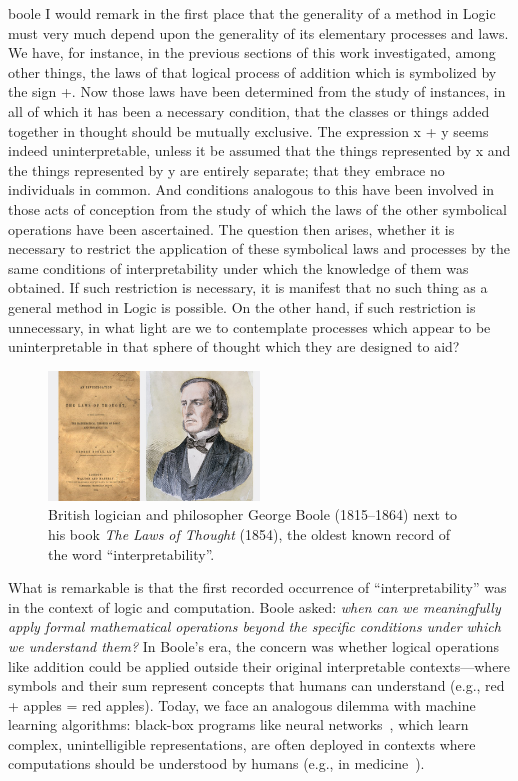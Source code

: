 \begin{displaycquote}[p.~48]{boole}
I would remark in the first place that the generality of a method in Logic
must very much depend upon the generality of its elementary processes and laws.
We have, for instance, in the previous sections of this work investigated, among
other things, the laws of that logical process of addition which is symbolized by
the sign +. Now those laws have been determined from the study of instances,
in all of which it has been a necessary condition, that the classes or things added
together in thought should be mutually exclusive. The expression x + y seems
indeed uninterpretable, unless it be assumed that the things represented by x
and the things represented by y are entirely separate; that they embrace no
individuals in common. And conditions analogous to this have been involved
in those acts of conception from the study of which the laws of the other
symbolical operations have been ascertained. The question then arises, whether
it is necessary to restrict the application of these symbolical laws and processes
by the same conditions of interpretability under which the knowledge of them
was obtained. If such restriction is necessary, it is manifest that no such thing
as a general method in Logic is possible. On the other hand, if such restriction
is unnecessary, in what light are we to contemplate processes which appear to
be uninterpretable in that sphere of thought which they are designed to aid?
\end{displaycquote}

\begin{figure}
    \centering
    \includegraphics[width=0.5\textwidth]{images/images_intro/gboole.jpg}
    \caption{British logician and philosopher George Boole (1815--1864) next to his book \textit{The Laws of Thought} (1854), the oldest known record of the word ``interpretability''.}
    \label{fig:george-boole}
\end{figure}

What is remarkable is that the first recorded occurrence of ``interpretability'' was in the context of logic and computation. Boole asked: \textit{when can we meaningfully apply formal mathematical operations beyond the specific conditions under which we understand them?}
In Boole's era, the concern was whether logical operations like addition could be applied outside their original interpretable contexts—where symbols and their sum represent concepts that humans can understand (e.g., red + apples = red apples). Today, we face an analogous dilemma with machine learning algorithms: black-box programs like neural networks~\cite{perceptron}, which learn complex, unintelligible representations, are often deployed in contexts where computations should be understood by humans (e.g., in medicine~\cite{black-box2}). 

